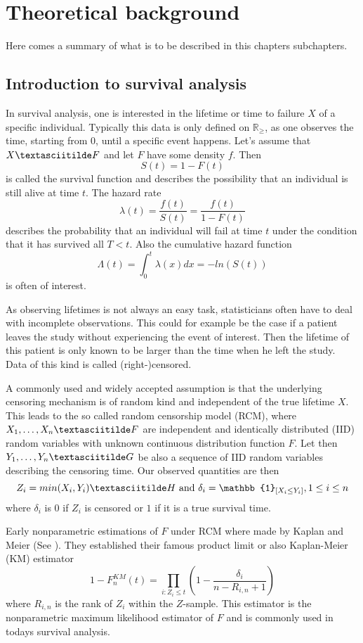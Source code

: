 \chapter{Theoretical background}

Here comes a summary of what is to be described in this chapters subchapters.

\section{Introduction to survival analysis}

In survival analysis, one is interested in the lifetime or time to failure $X$ of a specific individual. Typically this data is only defined on $\mathbb{R}_{\geq}$, as one observes the time, starting from 0, until a specific event happens. Let's assume that $X \textasciitilde F$ and let $F$ have some density $f$. Then
\[
S(t) = 1 - F(t)
\]
is called the survival function and describes the possibility that an individual is still alive at time $t$. The hazard rate 
\[
\lambda(t) = \frac{f(t)}{S(t)} = \frac{f(t)}{1-F(t)}
\]
describes the probability that an individual will fail at time $t$ under the condition that it has survived all $T<t$.
Also the cumulative hazard function 
\[
\Lambda(t) = \int_{0}^{t}\lambda(x)dx = -ln(S(t))
\]
is often of interest.

As observing lifetimes is not always an easy task, statisticians often have to deal with incomplete observations. This could for example be the case if a patient leaves the study without experiencing the event of interest. Then the lifetime of this patient is only known to be larger than the time when he left the study. Data of this kind is called (right-)censored.

A commonly used and widely accepted assumption is that the underlying censoring mechanism is of random kind and independent of the true lifetime $X$.
This leads to the so called random censorship model (RCM), where $X_1,\ldots ,X_n \textasciitilde F$ are independent and identically distributed (IID) random variables with unknown continuous distribution function $F$. Let then $Y_1,\ldots ,Y_n \textasciitilde G$ be also a sequence of IID random variables describing the censoring time. Our observed quantities are then
\[
Z_i = min(X_i,Y_i) \textasciitilde H \text{ and } \delta_i = \mathbb{1}_{[X_i\leq Y_i]}, 1 \leq i \leq n
\]
where $\delta_i$ is $0$ if $Z_i$ is censored or $1$ if it is a true survival time.

Early nonparametric estimations of $F$ under RCM where made by Kaplan and Meier (See \cite{KAPLANMEIER}). They established their famous product limit or also Kaplan-Meier (KM) estimator 
\begin{equation}\label{fnkm}
1-F_n^{KM}(t) =  \prod_{i:Z_i \leq t} \left( 1 - \frac{\delta_i}{n-R_{i,n} + 1} \right)
\end{equation}
where $R_{i,n}$ is the rank of $Z_i$ within the $Z$-sample. This estimator is the nonparametric maximum likelihood estimator of $F$ and is commonly used in todays survival analysis.


